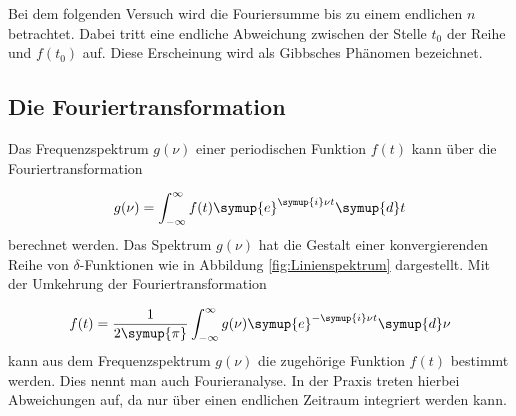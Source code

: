 Bei dem folgenden Versuch wird die Fouriersumme bis zu einem endlichen
$n$ betrachtet. Dabei tritt eine endliche Abweichung zwischen der Stelle $t_0$
der Reihe und $f(t_0)$ auf. Diese Erscheinung wird als Gibbsches Phänomen
bezeichnet.

\subsection{Die Fouriertransformation}

Das Frequenzspektrum $g(\nu)$ einer periodischen Funktion $f(t)$ kann über
die Fouriertransformation

\begin{equation}
  g(\nu) = \int_{-\infty}^{\infty} f(t) \symup{e}^{\symup{i}\nu t} \symup{d}t
\end{equation}
berechnet werden.
Das Spektrum $g(\nu)$ hat die Gestalt einer konvergierenden Reihe von
$\delta$-Funktionen wie in Abbildung \ref{fig:Linienspektrum} dargestellt.
Mit der Umkehrung der Fouriertransformation

\begin{equation}
  f(t) = \frac{1}{2\symup{\pi}} \int_{-\infty}^{\infty} g(\nu) \symup{e}^{
  -\symup{i}\nu t} \symup{d} \nu
\end{equation}
kann aus dem Frequenzspektrum $g(\nu)$ die zugehörige Funktion $f(t)$ bestimmt
werden. Dies nennt man auch Fourieranalyse.
In der Praxis treten hierbei Abweichungen auf, da nur über einen endlichen
Zeitraum integriert werden kann.
